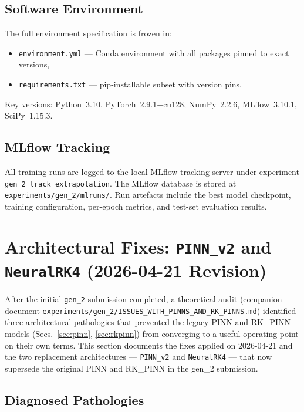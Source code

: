 \documentclass[a4paper,11pt]{article}
\begin{document}
\subsection{Software Environment}

The full environment specification is frozen in:
\begin{itemize}
  \item \texttt{environment.yml} --- Conda environment with all packages
    pinned to exact versions,
  \item \texttt{requirements.txt} --- pip-installable subset with version
    pins.
\end{itemize}
Key versions: Python~3.10, PyTorch~2.9.1+cu128, NumPy~2.2.6,
MLflow~3.10.1, SciPy~1.15.3.

\subsection{MLflow Tracking}

\begin{sloppypar}
All training runs are logged to the local MLflow tracking server
under experiment \texttt{gen\_2\_track\_\allowbreak extrapolation}.  The MLflow
database is stored at \texttt{experiments/\allowbreak gen\_2/\allowbreak mlruns/}.
Run artefacts include the best model checkpoint, training
configuration, per-epoch metrics, and test-set evaluation results.
\end{sloppypar}

\section{Architectural Fixes: \texttt{PINN\_v2} and \texttt{NeuralRK4}
(2026-04-21 Revision)}
\label{sec:v2_fixes}

After the initial \texttt{gen\_2} submission completed, a theoretical audit
(companion document
\texttt{experiments/gen\_2/ISSUES\_WITH\_PINNS\_AND\_RK\_PINNS.md}) identified
three architectural pathologies that prevented the legacy PINN and RK\_PINN
models (Secs.~\ref{sec:pinn}, \ref{sec:rkpinn}) from converging to a useful
operating point on their own terms. This section documents the fixes applied
on 2026-04-21 and the two replacement architectures --- \texttt{PINN\_v2}
and \texttt{NeuralRK4} --- that now supersede the original PINN and RK\_PINN
in the gen\_2 submission.

\subsection{Diagnosed Pathologies}
\label{sec:v2_pathologies}
\end{document}
